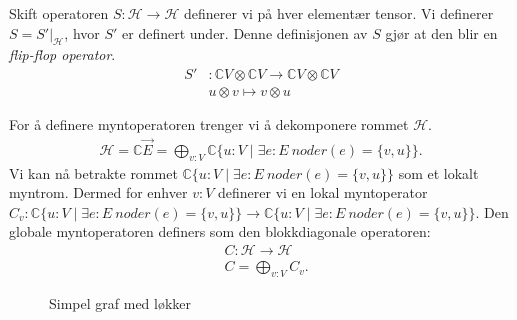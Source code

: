         Skift operatoren $S:\mathcal{H}\rightarrow\mathcal{H}$ definerer vi på hver elementær tensor. Vi definerer $S = S'|_\mathcal{H}$, hvor $S'$ er definert under. Denne definisjonen av $S$ gjør at den blir en \emph{flip-flop operator}.
        \begin{align*}
            S' & :\mathbb{C}V\otimes\mathbb{C}V \rightarrow \mathbb{C}V\otimes\mathbb{C}V \\
            & u\otimes v \mapsto v\otimes u
        \end{align*}

        For å definere myntoperatoren trenger vi å dekomponere rommet $\mathcal{H}$. 
        \begin{align*}
            \mathcal{H}=\mathbb{C}\vec{E}=\bigoplus_{v:V}\mathbb{C}\{u:V\mid \exists e:E\ noder(e)=\{v,u\}\}.
        \end{align*}
        Vi kan nå betrakte rommet $\mathbb{C}\{u:V\mid \exists e:E\ noder(e)=\{v,u\}\}$ som et lokalt myntrom. Dermed for enhver $v:V$ definerer vi en lokal myntoperator $C_v:\mathbb{C}\{u:V\mid \exists e:E\ noder(e)=\{v,u\}\}\rightarrow\mathbb{C}\{u:V\mid \exists e:E\ noder(e)=\{v,u\}\}$. Den globale myntoperatoren definers som den blokkdiagonale operatoren:
        \begin{align*}
            & C:\mathcal{H}\rightarrow\mathcal{H} \\
            & C = \bigoplus_{v:V}C_v.
        \end{align*}

        \begin{figure}
            \caption{Simpel graf med løkker}
            \begin{center}
                
            \end{center}
            \label{fig:Simp graf}
        \end{figure}

